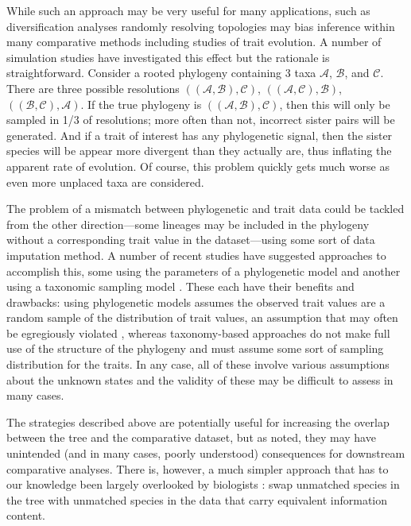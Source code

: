 \documentclass[a4paper,11pt]{article}
\begin{document}
While such an approach may be very useful for many applications, such as diversification analyses \citep{Kuhn2011, Rabosky2015} randomly resolving topologies may bias inference within many comparative methods including studies of trait evolution. A number of simulation studies have investigated this effect \citep{Losos1994, Martins1996, Davies2012, Bapst2014, Rabosky2015} but the rationale is straightforward. Consider a rooted phylogeny containing 3 taxa $\mathcal{A}$, $\mathcal{B}$, and $\mathcal{C}$. There are three possible resolutions $((\mathcal{A},\mathcal{B}),\mathcal{C})$, $((\mathcal{A},\mathcal{C}),\mathcal{B})$, $((\mathcal{B},\mathcal{C}),\mathcal{A})$. If the true phylogeny is $((\mathcal{A},\mathcal{B}),\mathcal{C})$, then this will only be sampled in 1/3 of resolutions; more often than not, incorrect sister pairs will be generated. And if a trait of interest has any phylogenetic signal, then the sister species will be appear more divergent than they actually are, thus inflating the apparent rate of evolution. Of course, this problem quickly gets much worse as even more unplaced taxa are considered.

The problem of a mismatch between phylogenetic and trait data could be tackled from the other direction---some lineages may be included in the phylogeny without a corresponding trait value in the dataset---using some sort of data imputation method. A number of recent studies have suggested approaches to accomplish this, some using the parameters of a phylogenetic model \citep{Fagan2013, Swenson2014, PEM} and another using a taxonomic sampling model \citep{FitzJohn2014}. These each have their benefits and drawbacks: using phylogenetic models assumes the observed trait values are a random sample of the distribution of trait values, an assumption that may often be egregiously violated \citep{FitzJohn2014}, whereas taxonomy-based approaches do not make full use of the structure of the phylogeny and must assume some sort of sampling distribution for the traits. In any case, all of these involve various assumptions about the unknown states and the validity of these may be difficult to assess in many cases.

The strategies described above are potentially useful for increasing the overlap between the tree and the comparative dataset, but as noted, they may have unintended (and in many cases, poorly understood) consequences for downstream comparative analyses. There is, however, a much simpler approach that has to our knowledge been largely overlooked by biologists \citep[but see][for an example]{Pennell2015}: swap unmatched species in the tree with unmatched species in the data that carry equivalent information content. 
\end{document}
